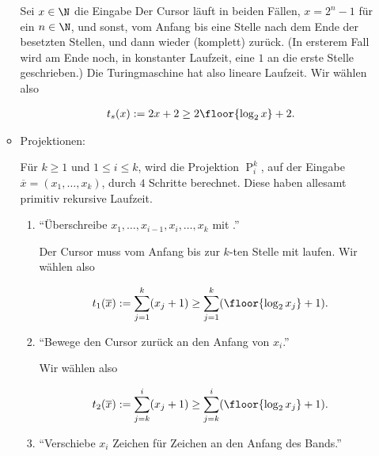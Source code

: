 \begin{solution}
\begin{enumerate}[wide, labelindent = 0pt]
\begin{itemize}
        Sei $x \in \N$ die Eingabe 
        Der Cursor läuft in beiden Fällen, $x = 2^n - 1$ für ein $n \in \N$, und sonst, vom Anfang bis eine Stelle nach dem Ende der besetzten Stellen, und dann wieder (komplett) zurück.
        (In ersterem Fall wird am Ende noch, in konstanter Laufzeit, eine $1$ an die erste Stelle geschrieben.)
        Die Turingmaschine hat also lineare Laufzeit.
        Wir wählen also

        \begin{align*}
            t_s(x)
            :=
            2 x + 2
            \geq
            2 \floor{\log_2 x} + 2.
        \end{align*}

        \item Projektionen:
        
        Für $k \geq 1$ und $1 \leq i \leq k$, wird die Projektion $\operatorname P_i^k$, auf der Eingabe $\overline x = (x_1, \dots, x_k)$, durch $4$ Schritte berechnet.
        Diese haben allesamt primitiv rekursive Laufzeit.

        \begin{enumerate}[label = \arabic*.]

            \item \enquote{Überschreibe $x_1, \dots, x_{i-1}, x_i, \dots, x_k$ mit \textvisiblespace.}

            Der Cursor muss vom Anfang bis zur $k$-ten Stelle mit \textvisiblespace laufen.
            Wir wählen also

            \begin{align*}
                t_1(\overline x)
                :=
                \sum_{j=1}^k
                    (x_j + 1)
                \geq
                \sum_{j=1}^k
                    (\floor{\log_2 x_j} + 1).
            \end{align*}

            \item \enquote{Bewege den Cursor zurück an den Anfang von $x_i$.}

            Wir wählen also

            \begin{align*}
                t_2(\overline x)
                :=
                \sum_{j=k}^i
                    (x_j + 1)
                \geq
                \sum_{j=k}^i
                    (\floor{\log_2 x_j} + 1).
            \end{align*}

            \item \enquote{Verschiebe $x_i$ Zeichen für Zeichen an den Anfang des Bands.}


\end{enumerate}
\end{itemize}
\end{enumerate}
\end{solution}

